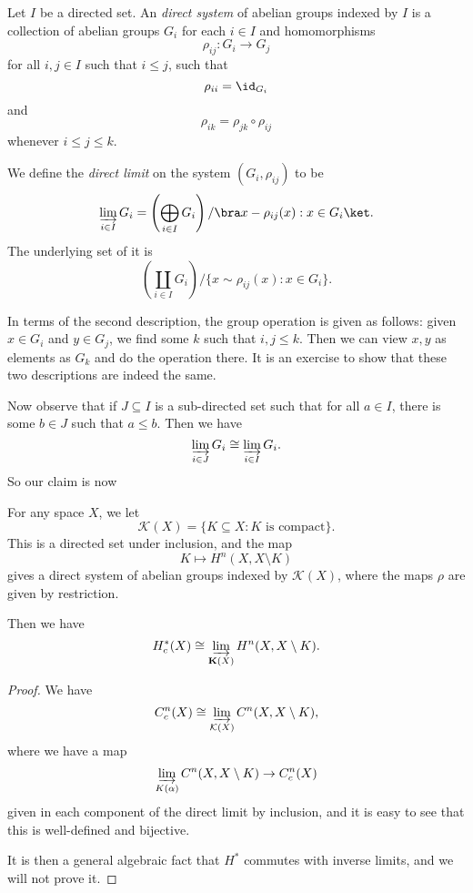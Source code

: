 \documentclass[a4paper]{article}
\theoremstyle{definition}
\begin{document}
\begin{defi}
  Let $I$ be a directed set. An \emph{direct system} of abelian groups indexed by $I$ is a collection of abelian groups $G_i$ for each $i \in I$ and homomorphisms
  \[
    \rho_{ij}: G_i \to G_j
  \]
  for all $i, j \in I$ such that $i \leq j$, such that
  \[
    \rho_{ii} = \id_{G_i}
  \]
  and
  \[
    \rho_{ik} = \rho_{jk} \circ \rho_{ij}
  \]
  whenever $i \leq j \leq k$.

  We define the \emph{direct limit} on the system $(G_i, \rho_{ij})$ to be
  \[
    \varinjlim_{i \in I} G_i = \left(\bigoplus_{i \in I} G_i\right)/\bra x - \rho_{ij}(x): x \in G_i\ket.
  \]
  The underlying set of it is
  \[
    \left(\coprod_{i \in I}G_i\right)/\{x \sim \rho_{ij}(x): x \in G_i\}.
  \]
\end{defi}
In terms of the second description, the group operation is given as follows: given $x \in G_i$ and $y \in G_j$, we find some $k$ such that $i, j \leq k$. Then we can view $x, y$ as elements as $G_k$ and do the operation there. It is an exercise to show that these two descriptions are indeed the same.

Now observe that if $J \subseteq I$ is a sub-directed set such that for all $a \in I$, there is some $b \in J$ such that $a \leq b$. Then we have
\[
  \varinjlim_{i \in J} G_i \cong \varinjlim_{i \in I} G_i.
\]
So our claim is now
\begin{thm}
  For any space $X$, we let
  \[
    \mathcal{K}(X) = \{K \subseteq X: K\text{ is compact}\}.
  \]
  This is a directed set under inclusion, and the map
  \[
    K \mapsto H^n(X, X \setminus K)
  \]
  gives a direct system of abelian groups indexed by $\mathcal{K}(X)$, where the maps $\rho$ are given by restriction.

  Then we have
  \[
    H^*_c(X) \cong \varinjlim_{\mathbf{K}(X)} H^n(X, X \setminus K).
  \]
\end{thm}

\begin{proof}
  We have
  \[
    C_c^n(X) \cong \varinjlim_{\mathcal{K}(X)} C^n(X, X \setminus K),
  \]
  where we have a map
  \[
     \varinjlim_{K(\alpha)} C^n(X, X \setminus K)\to C_c^n(X)
  \]
  given in each component of the direct limit by inclusion, and it is easy to see that this is well-defined and bijective.

  It is then a general algebraic fact that $H^*$ commutes with inverse limits, and we will not prove it.
\end{proof}
\end{document}

